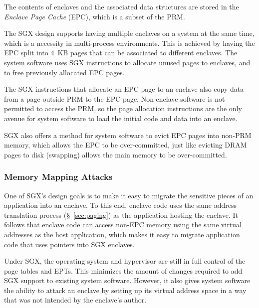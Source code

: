 
The contents of enclaves and the associated data structures are stored in the
\textit{Enclave Page Cache} (EPC), which is a subset of the PRM.

The SGX design supports having multiple enclaves on a system at the same time,
which is a  necessity in multi-process environments. This is achieved by having
the EPC split into 4~KB pages that can be associated to different enclaves. The
system software uses SGX instructions to allocate unused pages to enclaves, and
to free previously allocated EPC pages.

The SGX instructions that allocate an EPC page to an enclave also copy data
from a page outside PRM to the EPC page. Non-enclave software is not permitted
to access the PRM, so the page allocation instructions are the only avenue for
system software to load the initial code and data into an enclave.

SGX also offers a method for system software to evict EPC pages into non-PRM
memory, which allows the EPC to be over-committed, just like evicting DRAM
pages to disk (swapping) allows the main memory to be over-committed.


\subsubsection{Memory Mapping Attacks}
\label{sec:mapping_attacks}


One of SGX's design goals is to make it easy to migrate the sensitive pieces of
an application into an enclave. To this end, enclave code uses the same address
translation process (\S~\ref{sec:paging}) as the application hosting the
enclave. It follows that enclave code can access non-EPC memory using the same
virtual addresses as the host application, which makes it easy to migrate
application code that uses pointers into SGX enclaves.


Under SGX, the operating system and hypervisor are still in full control of the
page tables and EPTs. This minimizes the amount of changes required to add SGX
support to existing system software. However, it also gives system software the
ability to attack an enclave by setting up its virtual address space in a way
that was not intended by the enclave's author.


